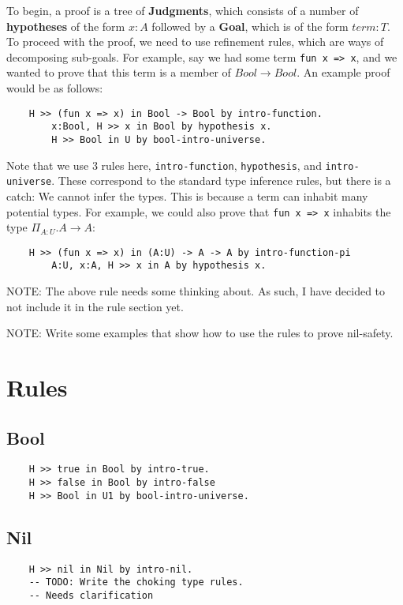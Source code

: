 \documentclass{article}
\begin{document}
To begin, a proof is a tree of \textbf{Judgments}, which consists of a number of \textbf{hypotheses} of the form $x:A$ followed by a \textbf{Goal}, which is of the form $term:T$. To proceed with the proof, we need to use refinement rules, which are ways of decomposing sub-goals. For example, say we had some term \lstinline{fun x => x}, and we wanted to prove that this term is a member of $Bool \rightarrow Bool$. An example proof would be as follows:
\begin{verbatim}
    H >> (fun x => x) in Bool -> Bool by intro-function.
        x:Bool, H >> x in Bool by hypothesis x.
        H >> Bool in U by bool-intro-universe.
\end{verbatim}
Note that we use 3 rules here, \lstinline{intro-function}, \lstinline{hypothesis}, and \lstinline{intro-universe}. These correspond to the standard type inference rules, but there is a catch: We cannot infer the types. This is because a term can inhabit many potential types. For example, we could also prove that \lstinline{fun x => x} inhabits the type $\Pi_{A:U}.A \rightarrow A$:
\begin{verbatim}
    H >> (fun x => x) in (A:U) -> A -> A by intro-function-pi
        A:U, x:A, H >> x in A by hypothesis x.
\end{verbatim}

{\color{red} NOTE:} The above rule needs some thinking about. As such, I have decided to not include it in the rule section yet.

{\color{red} NOTE:} Write some examples that show how to use the rules to prove nil-safety.

\section{Rules}
\subsection{Bool}
\begin{verbatim}
    H >> true in Bool by intro-true.
    H >> false in Bool by intro-false
    H >> Bool in U1 by bool-intro-universe.
\end{verbatim}
\subsection{Nil}
\begin{verbatim}
    H >> nil in Nil by intro-nil.
    -- TODO: Write the choking type rules.
    -- Needs clarification
\end{verbatim}
\end{document}
